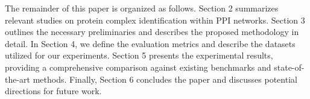 The remainder of this paper is organized as follows. Section 2 summarizes relevant studies on protein complex identification within PPI networks. Section 3 outlines the necessary preliminaries and describes the proposed methodology in detail. In Section 4, we define the evaluation metrics and describe the datasets utilized for our experiments. Section 5 presents the experimental results, providing a comprehensive comparison against existing benchmarks and state-of-the-art methods. Finally, Section 6 concludes the paper and discusses potential directions for future work.